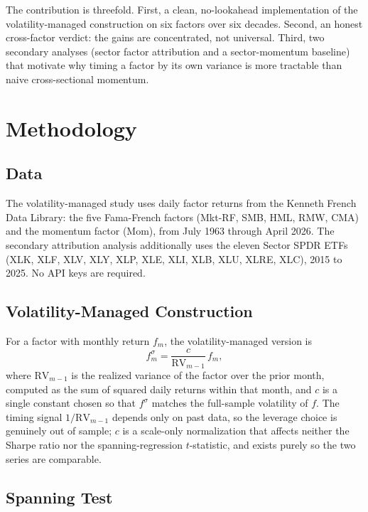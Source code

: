 \documentclass[11pt]{article}
\begin{document}
The contribution is threefold. First, a clean, no-lookahead implementation of the volatility-managed construction on six factors over six decades. Second, an honest cross-factor verdict: the gains are concentrated, not universal. Third, two secondary analyses (sector factor attribution and a sector-momentum baseline) that motivate why timing a factor by its own variance is more tractable than naive cross-sectional momentum.

\section{Methodology}

\subsection{Data}

The volatility-managed study uses daily factor returns from the Kenneth French Data Library: the five Fama-French factors (Mkt-RF, SMB, HML, RMW, CMA) and the momentum factor (Mom), from July 1963 through April 2026. The secondary attribution analysis additionally uses the eleven Sector SPDR ETFs (XLK, XLF, XLV, XLY, XLP, XLE, XLI, XLB, XLU, XLRE, XLC), 2015 to 2025. No API keys are required.

\subsection{Volatility-Managed Construction}

For a factor with monthly return $f_m$, the volatility-managed version is
\begin{equation}
    f^{\sigma}_m = \frac{c}{\mathrm{RV}_{m-1}}\, f_m,
\end{equation}
where $\mathrm{RV}_{m-1}$ is the realized variance of the factor over the prior month, computed as the sum of squared daily returns within that month, and $c$ is a single constant chosen so that $f^{\sigma}$ matches the full-sample volatility of $f$. The timing signal $1/\mathrm{RV}_{m-1}$ depends only on past data, so the leverage choice is genuinely out of sample; $c$ is a scale-only normalization that affects neither the Sharpe ratio nor the spanning-regression $t$-statistic, and exists purely so the two series are comparable.

\subsection{Spanning Test}
\end{document}
